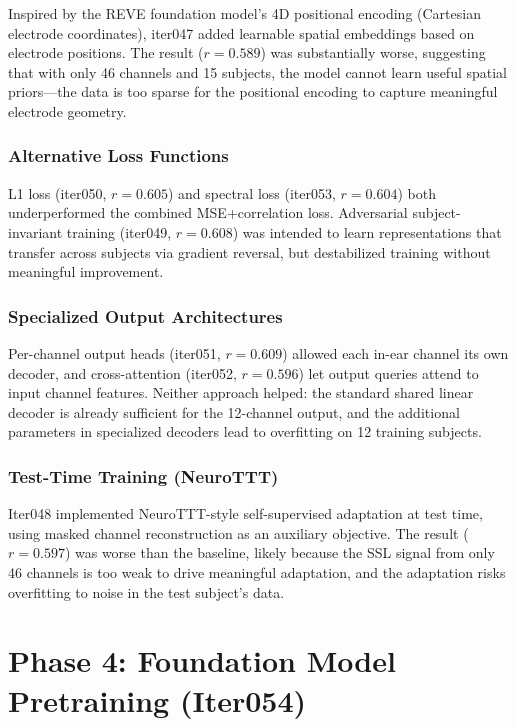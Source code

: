 \documentclass[11pt,a4paper]{article}
\begin{document}
Inspired by the REVE foundation model's 4D positional encoding
(Cartesian electrode coordinates), iter047 added learnable spatial
embeddings based on electrode positions. The result ($r=0.589$) was
substantially worse, suggesting that with only 46 channels and 15
subjects, the model cannot learn useful spatial priors---the data is too
sparse for the positional encoding to capture meaningful electrode
geometry.

\subsubsection{Alternative Loss Functions}

L1 loss (iter050, $r=0.605$) and spectral loss (iter053, $r=0.604$)
both underperformed the combined MSE+correlation loss. Adversarial
subject-invariant training (iter049, $r=0.608$) was intended to learn
representations that transfer across subjects via gradient reversal,
but destabilized training without meaningful improvement.

\subsubsection{Specialized Output Architectures}

Per-channel output heads (iter051, $r=0.609$) allowed each in-ear
channel its own decoder, and cross-attention (iter052, $r=0.596$)
let output queries attend to input channel features. Neither approach
helped: the standard shared linear decoder is already sufficient for the
12-channel output, and the additional parameters in specialized decoders
lead to overfitting on 12 training subjects.

\subsubsection{Test-Time Training (NeuroTTT)}

Iter048 implemented NeuroTTT-style self-supervised adaptation at test
time, using masked channel reconstruction as an auxiliary objective. The
result ($r=0.597$) was worse than the baseline, likely because the SSL
signal from only 46 channels is too weak to drive meaningful adaptation,
and the adaptation risks overfitting to noise in the test subject's data.

\section{Phase 4: Foundation Model Pretraining (Iter054)}
\end{document}

